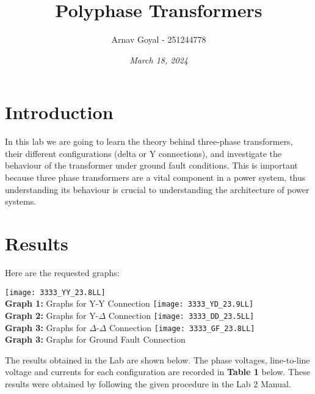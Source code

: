 \documentclass[]{report}
\title{\textbf{Polyphase Transformers}}
\date{\textit{March 18, 2024}}
\author{Arnav Goyal - 251244778}
\begin{document}
\maketitle

\section*{Introduction}

In this lab we are going to learn the theory behind three-phase transformers, their different configurations (delta or Y connections), and investigate the behaviour of the transformer under ground fault conditions. This is important because three phase transformers are a vital component in a power system, thus understanding its behaviour is crucial to understanding the architecture of power systems.

\section*{Results}
Here are the requested graphs:

\begin{center}
	\texttt{[image: 3333\_YY\_23.8LL]} \\
	\textbf{Graph 1:} Graphs for Y-Y Connection
	\vspace{2em}
	\texttt{[image: 3333\_YD\_23.9LL]} \\
	\textbf{Graph 2:} Graphs for Y-$\Delta$ Connection
	\vspace{2em}
	\texttt{[image: 3333\_DD\_23.5LL]} \\
	\textbf{Graph 3:} Graphs for $\Delta$-$\Delta$ Connection
	\vspace{2em}
	\texttt{[image: 3333\_GF\_23.8LL]} \\
	\textbf{Graph 3:} Graphs for Ground Fault Connection
	\vspace{2em}
\end{center}


The results obtained in the Lab are shown below. The phase voltages, line-to-line voltage and currents for each configuration are recorded in \textbf{Table 1} below. These results were obtained by following the given procedure in the Lab 2 Manual.
\end{document}
